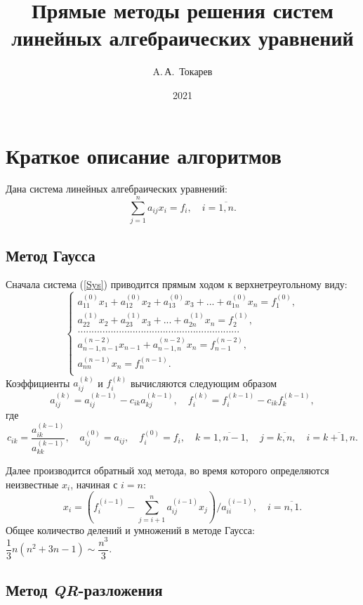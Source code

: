 \documentclass[12pt, a4paper]{article}
\title{Прямые методы решения систем линейных алгебраических уравнений}
\author{A.\,А.~Токарев}
\date{2021}
\def\hmath$#1${\texorpdfstring{{\rmfamily\textit{#1}}}{#1}}
\begin{document}
\maketitle
\tableofcontents 
\newpage

\section{Краткое описание алгоритмов}
Дана система линейных алгебраических уравнений:
\begin{equation}
\sum_{j=1}^{n} a_{ij}x_i = f_i , \quad i = \overline{1,n}.
\label{Sys}
\end{equation}

\subsection{Метод Гаусса}
Сначала система (\ref{Sys}) приводится прямым ходом к верхнетреугольному виду: 
\[\left\{
\begin{aligned}
a_{11}^{(0)}x_1 + a_{12}^{(0)}x_2 + a_{13}^{(0)}x_3 + ... + a_{1n}^{(0)}x_n = f_1^{(0)},\\
a_{22}^{(1)}x_2 + a_{23}^{(1)}x_3 + ... + a_{2n}^{(1)}x_n = f_2^{(1)},\\
...........................................................\\
a_{n-1,n-1}^{(n-2)}x_{n-1} + a_{n-1,n}^{(n-2)}x_n = f_{n-1}^{(n-2)},\\
a_{nn}^{(n-1)}x_n = f_{n}^{(n-1)}.\\
\end{aligned}
\right.
\]
Коэффициенты $a_{ij}^{(k)}$ и $f_i^{(k)}$ вычисляются следующим образом
\[
a_{ij}^{(k)} = a_{ij}^{(k-1)} - c_{ik}a_{kj}^{(k-1)}, \quad f_{i}^{(k)} = f_{i}^{(k-1)} - c_{ik}f_{k}^{(k-1)}, 
\]
где
\[
c_{ik} = \dfrac{a_{ik}^{(k-1)}}{a_{kk}^{(k-1)}}, \quad a_{ij}^{(0)}=a_{ij}, \quad f_{i}^{(0)} = f_i, \quad k = \overline{1,n-1},\quad j =\overline{k,n}, \quad i = \overline{k+1,n}.
\]

Далее производится обратный ход метода, во время которого определяются неизвестные $x_i$, начиная с $i = n$:
\[
x_i =\left(f_i^{(i-1)}-\sum_{j=i+1}^{n} a_{ij}^{(i-1)}x_j\right)/a_{ii}^{(i-1)}, \quad i = \overline{n,1}.
\]
Общее количество делений и умножений в методе Гаусса: $\dfrac{1}{3}n(n^2+3n-1) \sim \dfrac{n^3}{3}$.

\newpage

\subsection {Метод \hmath $QR$-разложения}
\end{document}
